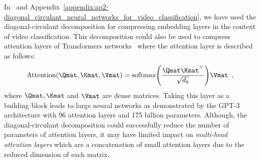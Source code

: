 In~ and Appendix~\ref{appendix:ap2-diagonal_circulant_neural_networks_for_video_classification}, we have used the diagonal-circulant decomposition for compressing embedding layers in the context of video classification.
This decomposition could also be used to compress attention layers of Transformers networks~\cite{vaswani2017attention} where the attention layer is described as follows:
\begin{equation}
  \text{Attention}(\Qmat, \Kmat, \Vmat) = \text{softmax} \left( \frac{\Qmat \Kmat^\top}{\sqrt{d_k}} \right) \Vmat \enspace,
\end{equation}
where $\Qmat, \Kmat$ and $\Vmat$ are dense matrices.
Taking this layer as a building block leads to large neural networks as demonstrated by the GPT-3 architecture with 96 attention layers and 175 billion parameters.
Although, the diagonal-circulant decomposition could successfully reduce the number of parameters of attention layers, it may have limited impact on \emph{multi-head attention layers} which are a concatenation of small attention layers due to the reduced dimension of each matrix.



%
%
%
%
%
%



